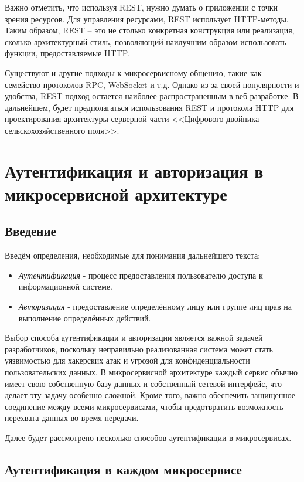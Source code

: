     Важно отметить, что используя REST, нужно думать о приложении с точки зрения ресурсов. Для управления ресурсами, REST использует HTTP-методы. Таким образом, REST – это не столько конкретная конструкция или реализация, сколько архитектурный стиль, позволяющий наилучшим образом использовать функции, предоставляемые HTTP.

    Существуют и другие подходы к микросервисному общению, такие как семейство протоколов RPC, WebSocket и т.д. Однако из-за своей популярности и удобства,  REST-подход остается наиболее распространенным в веб-разработке. В дальнейшем, будет предполагаться использования REST и протокола HTTP для проектирования архитектуры серверной части <<Цифрового двойника сельскохозяйственного поля>>.
        
       \section{Аутентификация и авторизация в микросервисной архитектуре}

        \subsection{Введение}
        Введём определения, необходимые для понимания дальнейшего текста:
        \begin{itemize}
            \item \textit{Аутентификация} - процесс предоставления пользователю доступа к информационной системе. \cite{auth}
             \item \textit{Авторизация} - предоставление определённому лицу или группе лиц прав на выполнение определённых действий. \cite{auth}
        \end{itemize}
        

        Выбор способа аутентификации и авторизации является важной задачей разработчиков, поскольку неправильно реализованная система может стать уязвимостью для хакерских атак и угрозой для конфиденциальности пользовательских данных. В микросервисной архитектуре каждый сервис обычно имеет свою собственную базу данных и собственный сетевой интерфейс, что делает эту задачу особенно сложной. Кроме того, важно обеспечить защищенное соединение между всеми микросервисами, чтобы предотвратить возможность перехвата данных во время передачи. 
        
        Далее будет рассмотрено несколько способов аутентификации в микросервисах.

        
        \subsection{Аутентификация в каждом микросервисе}
        

